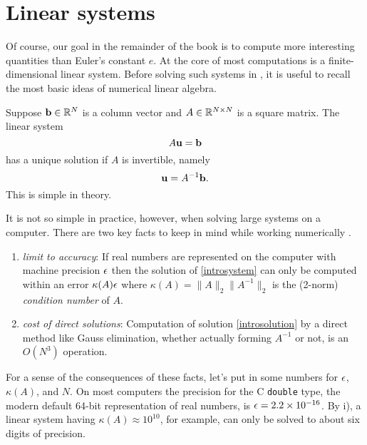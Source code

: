 \section{Linear systems}

Of course, our goal in the remainder of the book is to compute more interesting quantities than Euler's constant $e$.  At the core of most \PETSc computations is a finite-dimensional linear system.  Before solving such systems in \PETSc, it is useful to recall the most basic ideas of numerical linear algebra.

Suppose $\mathbf{b}\in \mathbb{R}^{N}$ is a column vector and $A\in\mathbb{R}^{N\times N}$ is a square matrix.  The linear system
\begin{equation}
A \mathbf{u} = \mathbf{b} \label{introsystem}
\end{equation}
has a unique solution if $A$ is invertible, namely
\begin{equation}
\mathbf{u} = A^{-1} \mathbf{b}. \label{introsolution}
\end{equation}
This is simple in theory.

It is not so simple in practice, however, when solving large systems on a computer.  There are two key facts to keep in mind while working numerically  \citep{TrefethenBau}.
\renewcommand{\labelenumi}{\roman{enumi})}
\begin{enumerate}
\item \emph{limit to accuracy}:  If real numbers are represented on the computer with machine precision $\epsilon$ then the solution of \eqref{introsystem} can only be computed within an error $\kappa(A) \epsilon$ where $\kappa(A) = \|A\|_2 \|A^{-1}\|_2$ is the (2-norm) \emph{condition number} of $A$.
\item \emph{cost of direct solutions}:  Computation of solution \eqref{introsolution} by a direct method like Gauss elimination, whether actually forming $A^{-1}$ or not, is an $O(N^3)$ operation.
\end{enumerate}

For a sense of the consequences of these facts, let's put in some numbers for $\epsilon$, $\kappa(A)$, and $N$.  On most computers the precision for the C \texttt{double} type, the modern default 64-bit representation of real numbers, is $\epsilon = 2.2 \times 10^{-16}$.  By i), a linear system having $\kappa(A) \approx 10^{10}$, for example, can only be solved to about six digits of precision.

